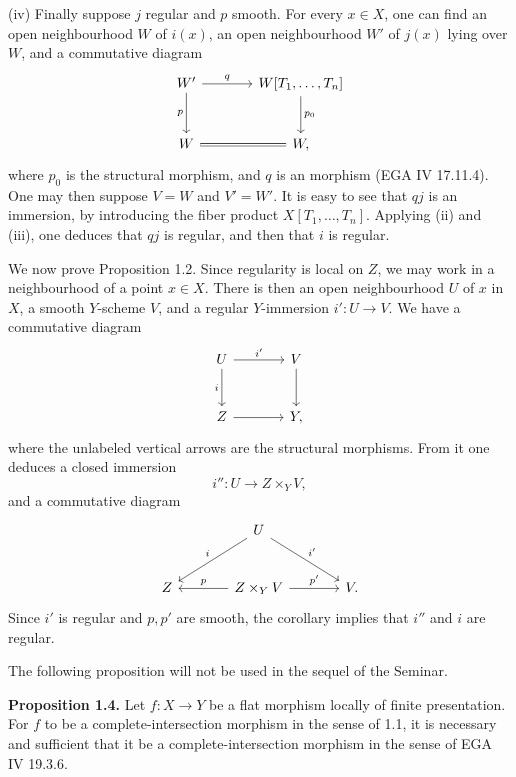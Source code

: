 \documentclass[11pt]{article}
\begin{document}
(iv) Finally suppose $j$ regular and $p$ smooth. For every $x\in X$, one can find an open neighbourhood $W$ of $i(x)$, an open neighbourhood $W'$ of $j(x)$ lying over $W$, and a commutative diagram
\[
\begin{tikzcd}[column sep=large,row sep=large]
W' \arrow[r,"q"] \arrow[d,"p"'] & W[T_1,\ldots,T_n] \arrow[d,"p_0"]\\
W \arrow[r,equal] & W,
\end{tikzcd}
\]
where $p_0$ is the structural morphism, and $q$ is an \etale morphism (EGA IV 17.11.4). One may then suppose $V=W$ and $V'=W'$. It is easy to see that $qj$ is an immersion, by introducing the fiber product $X[T_1,\ldots,T_n]$. Applying (ii) and (iii), one deduces that $qj$ is regular, and then that $i$ is regular.

We now prove Proposition 1.2. Since regularity is local on $Z$, we may work in a neighbourhood of a point $x\in X$. There is then an open neighbourhood $U$ of $x$ in $X$, a smooth $Y$-scheme $V$, and a regular $Y$-immersion $i':U\to V$. We have a commutative diagram
\[
\begin{tikzcd}[column sep=large,row sep=large]
U \arrow[r,"i'"] \arrow[d,"i"'] & V \arrow[d]\\
Z \arrow[r] & Y,
\end{tikzcd}
\]
where the unlabeled vertical arrows are the structural morphisms. From it one deduces a closed immersion
\[
i'':U\longrightarrow Z\times_Y V,
\]
and a commutative diagram
\[
\begin{tikzcd}[column sep=large,row sep=large]
& U \arrow[dl,"i"'] \arrow[dr,"i'"] &\\
Z & Z\times_Y V \arrow[l,"p"'] \arrow[r,"p'"] & V.
\end{tikzcd}
\]
Since $i'$ is regular and $p,p'$ are smooth, the corollary implies that $i''$ and $i$ are regular.

The following proposition will not be used in the sequel of the Seminar.

\textbf{Proposition 1.4.} Let $f:X\to Y$ be a flat morphism locally of finite presentation. For $f$ to be a complete-intersection morphism in the sense of 1.1, it is necessary and sufficient that it be a complete-intersection morphism in the sense of EGA IV 19.3.6.
\end{document}
